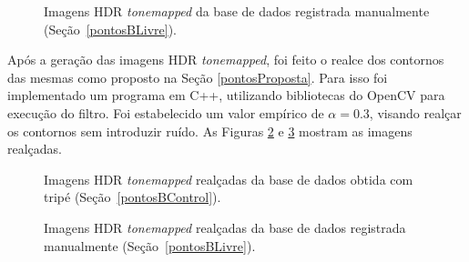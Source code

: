 \begin{figure}[H]
  \centering 
  \quad %
  \quad %
  \quad %
  \caption{Imagens HDR \textit{tonemapped} da base de dados registrada manualmente (Seção~\protect\ref{pontosBLivre}).}
  \label{figRes2Tonemap}
\end{figure}

Após a geração das imagens HDR \textit{tonemapped}, foi feito o realce dos contornos das mesmas como proposto na Seção \ref{pontosProposta}. Para isso foi implementado um programa em C++, utilizando bibliotecas do OpenCV para execução do filtro. Foi estabelecido um valor empírico de $\alpha = 0.3$, visando realçar os contornos sem introduzir ruído. As Figuras \ref{figResRealce} e \ref{figRes2Realce} mostram as imagens realçadas.

\begin{figure}[H]
  \centering 
  \quad %
  \quad %
  \quad %
  \caption{Imagens HDR \textit{tonemapped} realçadas da base de dados obtida com tripé (Seção~\protect\ref{pontosBControl}).}
  \label{figResRealce}
\end{figure}

\begin{figure}[H]
  \centering 
  \quad %
  \quad %
  \quad %
  \caption{Imagens HDR \textit{tonemapped} realçadas da base de dados registrada manualmente (Seção~\protect\ref{pontosBLivre}).}
  \label{figRes2Realce}
\end{figure}


